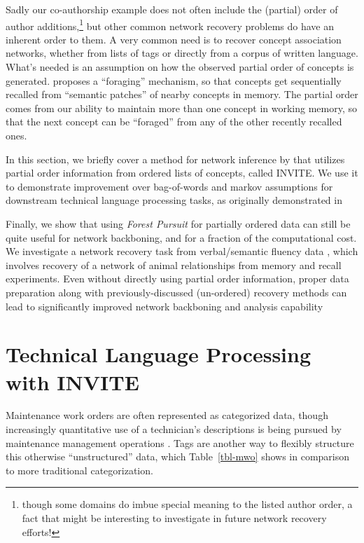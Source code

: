 \documentclass[%
	12pt,
		oneside,
		letterpaper
]{book}
\begin{document}
Sadly our co-authorship example does not often include the (partial) order of author additions,\footnote{though some domains do imbue special meaning to the listed author order, a fact that might be interesting to investigate in future network recovery efforts!} but other common network recovery problems do have an inherent order to them.
A very common need is to recover concept association networks, whether from lists of tags or directly from a corpus of written language.
What's needed is an assumption on how the observed partial order of concepts is generated.
\textcite{ForagingSemanticFields_Hills2015} proposes a ``foraging'' mechanism, so that concepts get sequentially recalled from ``semantic patches'' of nearby concepts in memory.
The partial order comes from our ability to maintain more than one concept in working memory, so that the next concept can be ``foraged'' from any of the other recently recalled ones\autocite{magicalnumberseven_Miller1956,Dynamicsearchworking_Hills2012}.

In this section, we briefly cover a method for network inference by \textcite{Humanmemorysearch_Jun2015} that utilizes partial order information from ordered lists of concepts, called INVITE.
We use it to demonstrate improvement over bag-of-words and markov assumptions for downstream technical language processing \autocite{Technicallanguageprocessing_Brundage2021} tasks, as originally demonstrated in \autocites{UsingSemanticFluency_Sexton2019}[and][]{OrganizingTaggedKnowledge_Sexton2020}

Finally, we show that using \emph{Forest Pursuit} for partially ordered data can still be quite useful for network backboning, and for a fraction of the computational cost.
We investigate a network recovery task from verbal/semantic fluency data \autocite{Estimatingsemanticnetworks_Zemla2018}, which involves recovery of a network of animal relationships from memory and recall experiments.
Even without directly using partial order information, proper data preparation along with previously-discussed (un-ordered) recovery methods can lead to significantly improved network backboning and analysis capability

\section{Technical Language Processing with INVITE}\label{technical-language-processing-with-invite}

Maintenance work orders are often represented as categorized data, though increasingly quantitative use of a technician's descriptions is being pursued by maintenance management operations \autocite{BenchmarkingKeywordExtraction_Sexton2018,CategorizationErrorsData_Sexton2019}.
Tags are another way to flexibly structure this otherwise ``unstructured'' data, which Table~\ref{tbl-mwo} shows in comparison to more traditional categorization.
\end{document}
